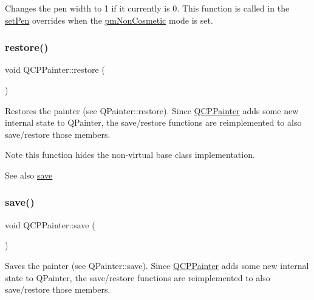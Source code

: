 Changes the pen width to 1 if it currently is 0. This function is called in the \hyperlink{class_q_c_p_painter_af9c7a4cd1791403901f8c5b82a150195}{set\+Pen} overrides when the \hyperlink{class_q_c_p_painter_a156cf16444ff5e0d81a73c615fdb156dab1f50f65b248c5222d1d826cc01c837a}{pm\+Non\+Cosmetic} mode is set. \mbox{\label{class_q_c_p_painter_a64908e6298d5bbd83457dc987cc3a022}} 
\subsubsection{\texorpdfstring{restore()}{restore()}}
{\footnotesize\ttfamily void Q\+C\+P\+Painter\+::restore (\begin{DoxyParamCaption}{ }\end{DoxyParamCaption})}

Restores the painter (see Q\+Painter\+::restore). Since \hyperlink{class_q_c_p_painter}{Q\+C\+P\+Painter} adds some new internal state to Q\+Painter, the save/restore functions are reimplemented to also save/restore those members.

\begin{DoxyNote}{Note}
this function hides the non-\/virtual base class implementation.
\end{DoxyNote}
\begin{DoxySeeAlso}{See also}
\hyperlink{class_q_c_p_painter_a8fd6821ee6fecbfa04444c9062912abd}{save} 
\end{DoxySeeAlso}
\mbox{\label{class_q_c_p_painter_a8fd6821ee6fecbfa04444c9062912abd}} 
\subsubsection{\texorpdfstring{save()}{save()}}
{\footnotesize\ttfamily void Q\+C\+P\+Painter\+::save (\begin{DoxyParamCaption}{ }\end{DoxyParamCaption})}

Saves the painter (see Q\+Painter\+::save). Since \hyperlink{class_q_c_p_painter}{Q\+C\+P\+Painter} adds some new internal state to Q\+Painter, the save/restore functions are reimplemented to also save/restore those members.

